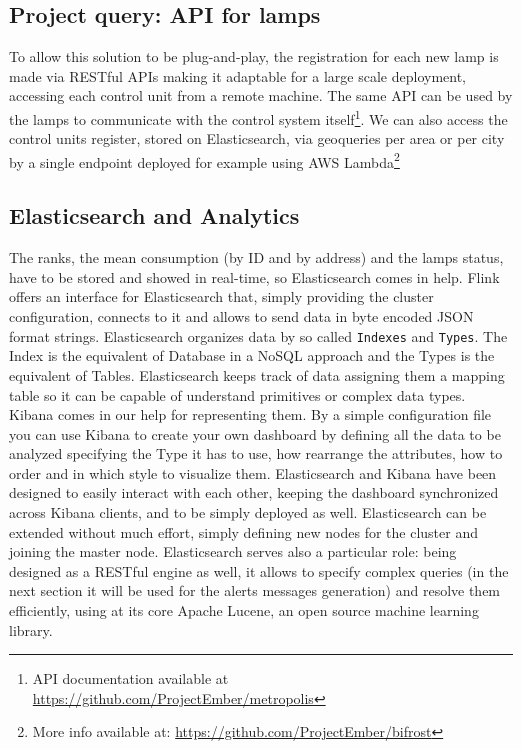 \subsection*{Project query: API for lamps}
To allow this solution to be plug-and-play, the registration for each new lamp is made via RESTful APIs making it adaptable for a large scale deployment, accessing each control unit from a remote machine. The same API can be used by the lamps to communicate with the control system itself\footnote{API documentation available at \url{https://github.com/ProjectEmber/metropolis}}. We can also access the control units register, stored on Elasticsearch, via geoqueries per area or per city by a single endpoint deployed for example using AWS Lambda\footnote{More info available at: \url{https://github.com/ProjectEmber/bifrost}}

\subsection{Elasticsearch and Analytics}
The ranks, the mean consumption (by ID and by address) and the lamps status, have to be stored and showed in real-time, so Elasticsearch comes in help. Flink offers an interface for Elasticsearch that, simply providing the cluster configuration, connects to it and allows to send data in byte encoded JSON format strings. Elasticsearch organizes data by so called \texttt{Indexes} and \texttt{Types}. The Index is the equivalent of Database in a NoSQL approach and the Types is the equivalent of Tables. Elasticsearch keeps track of data assigning them a mapping table so it can be capable of understand primitives or complex data types. Kibana comes in our help for representing them. By a simple configuration file you can use Kibana to create your own dashboard by defining all the data to be analyzed specifying the Type it has to use, how rearrange the attributes, how to order and in which style to visualize them. Elasticsearch and Kibana have been designed to easily interact with each other, keeping the dashboard synchronized across Kibana clients, and to be simply deployed as well. Elasticsearch can be extended without much effort, simply defining new nodes for the cluster and joining the master node. Elasticsearch serves also a particular role: being designed as a RESTful engine as well, it allows to specify complex queries (in the next section it will be used for the alerts messages generation) and resolve them efficiently, using at its core Apache Lucene, an open source machine learning library.

